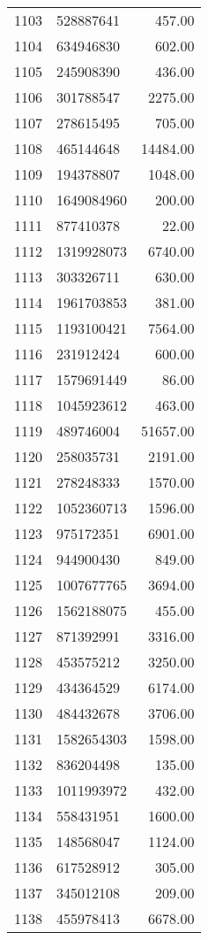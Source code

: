 \begin{table}[ht]
\begin{tabular}{rlr}
  1103 & 528887641 & 457.00 \\ 
  1104 & 634946830 & 602.00 \\ 
  1105 & 245908390 & 436.00 \\ 
  1106 & 301788547 & 2275.00 \\ 
  1107 & 278615495 & 705.00 \\ 
  1108 & 465144648 & 14484.00 \\ 
  1109 & 194378807 & 1048.00 \\ 
  1110 & 1649084960 & 200.00 \\ 
  1111 & 877410378 & 22.00 \\ 
  1112 & 1319928073 & 6740.00 \\ 
  1113 & 303326711 & 630.00 \\ 
  1114 & 1961703853 & 381.00 \\ 
  1115 & 1193100421 & 7564.00 \\ 
  1116 & 231912424 & 600.00 \\ 
  1117 & 1579691449 & 86.00 \\ 
  1118 & 1045923612 & 463.00 \\ 
  1119 & 489746004 & 51657.00 \\ 
  1120 & 258035731 & 2191.00 \\ 
  1121 & 278248333 & 1570.00 \\ 
  1122 & 1052360713 & 1596.00 \\ 
  1123 & 975172351 & 6901.00 \\ 
  1124 & 944900430 & 849.00 \\ 
  1125 & 1007677765 & 3694.00 \\ 
  1126 & 1562188075 & 455.00 \\ 
  1127 & 871392991 & 3316.00 \\ 
  1128 & 453575212 & 3250.00 \\ 
  1129 & 434364529 & 6174.00 \\ 
  1130 & 484432678 & 3706.00 \\ 
  1131 & 1582654303 & 1598.00 \\ 
  1132 & 836204498 & 135.00 \\ 
  1133 & 1011993972 & 432.00 \\ 
  1134 & 558431951 & 1600.00 \\ 
  1135 & 148568047 & 1124.00 \\ 
  1136 & 617528912 & 305.00 \\ 
  1137 & 345012108 & 209.00 \\ 
  1138 & 455978413 & 6678.00 \\ 

\end{tabular}
\end{table}
